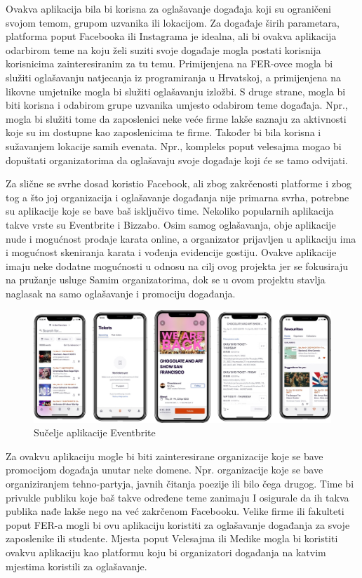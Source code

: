Ovakva aplikacija bila bi korisna za oglašavanje događaja koji su ograničeni svojom temom, grupom uzvanika ili lokacijom. Za događaje širih parametara, platforma poput Facebooka ili Instagrama je idealna, ali bi ovakva aplikacija odarbirom teme na koju želi suziti svoje događaje mogla postati korisnija korisnicima zainteresiranim za tu temu. Primijenjena na FER-ovce mogla bi služiti oglašavanju natjecanja iz programiranja u Hrvatskoj, a primijenjena na likovne umjetnike mogla bi služiti oglašavanju izložbi. S druge strane, mogla bi biti korisna i odabirom grupe uzvanika umjesto odabirom teme događaja. Npr., mogla bi služiti tome da zaposlenici neke veće firme lakše saznaju za aktivnosti koje su im dostupne kao zaposlenicima te firme. Također bi bila korisna i sužavanjem lokacije samih evenata. Npr., kompleks poput velesajma mogao bi dopuštati organizatorima da oglašavaju svoje događaje koji će se tamo odvijati.

Za slične se svrhe dosad koristio Facebook, ali zbog zakrčenosti platforme i zbog tog a što joj organizacija i oglašavanje događanja nije primarna svrha, potrebne su aplikacije koje se bave baš isključivo time. Nekoliko popularnih aplikacija takve vrste su Eventbrite i Bizzabo. Osim samog oglašavanja, obje aplikacije nude i mogućnost prodaje karata online, a organizator prijavljen u aplikaciju ima i mogućnost skeniranja karata i vođenja evidencije gostiju. Ovakve aplikacije imaju neke dodatne mogućnosti u odnosu na cilj ovog projekta jer se fokusiraju na pružanje usluge Samim organizatorima, dok se u ovom projektu stavlja naglasak na samo oglašavanje i promociju događanja.


		\begin{figure}[H]
			\includegraphics[scale=0.2]{slike/eventbrite.jpg} %
			\centering
			\caption{Sučelje aplikacije Eventbrite}
			\label{fig:promjene}
		\end{figure}


Za ovakvu aplikaciju mogle bi biti zainteresirane organizacije koje se bave promocijom događaja unutar neke domene. Npr. organizacije koje se bave organiziranjem tehno-partyja, javnih čitanja poezije ili bilo čega drugog. Time bi privukle publiku  koje baš takve određene teme zanimaju I osigurale da ih takva publika nađe lakše nego na već zakrčenom Facebooku. Velike firme ili fakulteti poput FER-a mogli bi ovu aplikaciju koristiti za oglašavanje događanja za svoje zaposlenike ili studente. Mjesta poput Velesajma ili Medike mogla bi koristiti ovakvu aplikaciju kao platformu koju bi organizatori događanja na katvim mjestima koristili za oglašavanje.

